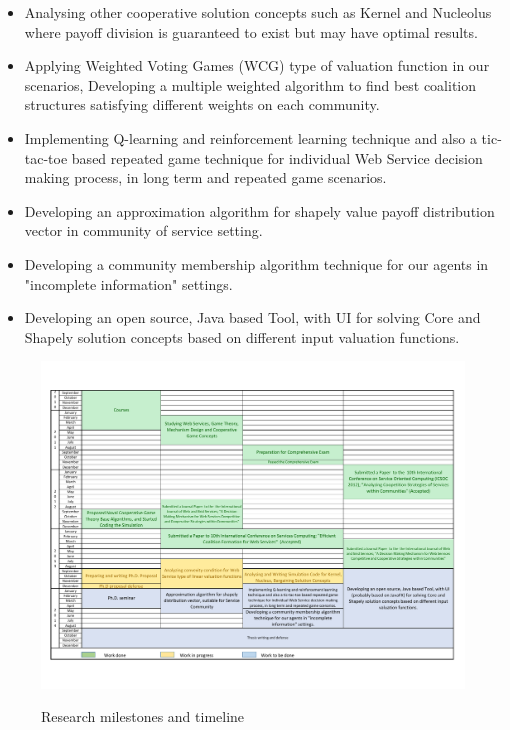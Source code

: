 \begin{itemize}
\item Analysing other cooperative solution concepts such as Kernel and Nucleolus where payoff division is guaranteed to exist but may have optimal results.
\item Applying Weighted Voting Games (WCG) type of valuation function in our scenarios, Developing a multiple weighted algorithm to find best coalition structures satisfying different weights on each community.
\item Implementing Q-learning and reinforcement learning technique and also a tic-tac-toe based repeated game technique for individual Web Service decision making process, in long term and repeated game scenarios.
\item Developing an approximation algorithm for shapely value payoff distribution vector in community of service setting.
\item Developing a community membership algorithm technique for our agents in "incomplete information" settings.
\item Developing an open source, Java based Tool, with UI for solving Core and Shapely solution concepts based on different input valuation functions.
\end{itemize}


    \begin{figure}
                \begin{center}
                \includegraphics[width=16cm]{timeline/timetable.pdf}\label{Timetable}
                \caption{Research milestones and timeline}
                \end{center}
    \end{figure}   